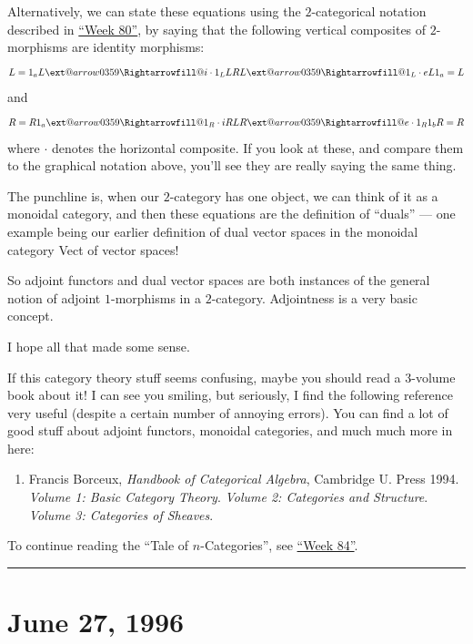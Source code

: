 \documentclass{article}
\makeatletter
\def\tightlist{}
\newcommand{\xRightarrow}[2][]{\ext@arrow 0359\Rightarrowfill@{#1}{#2}}
\makeatother
\begin{document}
Alternatively, we can state these equations using the \(2\)-categorical
notation described in \protect\hyperlink{week80}{``Week 80''}, by saying
that the following vertical composites of \(2\)-morphisms are identity
morphisms:
\[L = 1_aL\xRightarrow{i\cdot1_L}LRL\xRightarrow{1_L\cdot e}L1_a = L\]
and
\[R = R1_a\xRightarrow{1_R\cdot i}RLR\xRightarrow{e\cdot1_R}1_bR = R\]
where \(\cdot\) denotes the horizontal composite. If you look at these,
and compare them to the graphical notation above, you'll see they are
really saying the same thing.

The punchline is, when our \(2\)-category has one object, we can think
of it as a monoidal category, and then these equations are the
definition of ``duals'' --- one example being our earlier definition of
dual vector spaces in the monoidal category Vect of vector spaces!

So adjoint functors and dual vector spaces are both instances of the
general notion of adjoint \(1\)-morphisms in a \(2\)-category.
Adjointness is a very basic concept.

I hope all that made some sense.

If this category theory stuff seems confusing, maybe you should read a
3-volume book about it! I can see you smiling, but seriously, I find the
following reference very useful (despite a certain number of annoying
errors). You can find a lot of good stuff about adjoint functors,
monoidal categories, and much much more in here:

\begin{enumerate}
\def\labelenumi{\arabic{enumi})}
\setcounter{enumi}{1}
\tightlist
\item
  Francis Borceux, \emph{Handbook of Categorical Algebra}, Cambridge U.
  Press 1994. \emph{Volume 1: Basic Category Theory}. \emph{Volume 2:
  Categories and Structure}. \emph{Volume 3: Categories of Sheaves}.
\end{enumerate}

To continue reading the ``Tale of \(n\)-Categories'', see
\protect\hyperlink{week84}{``Week 84''}.

\begin{center}\rule{0.5\linewidth}{0.5pt}\end{center}



\hypertarget{week84}{%
\section{June 27, 1996}\label{week84}}
\end{document}
